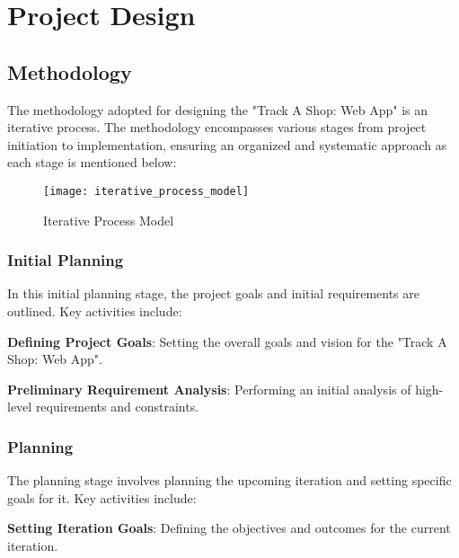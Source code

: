 
\chapter{Project Design} %

\label{Chapter3} %



\section{Methodology}
The methodology adopted for designing the "Track A Shop: Web App" is an iterative process. The methodology encompasses various stages from project initiation to implementation, ensuring an organized and systematic approach as each stage is mentioned below:

\begin{figure}[h]
	\centering
	\texttt{[image: iterative\_process\_model]}
	\caption{Iterative Process Model}
\end{figure}

\subsection{Initial Planning}

In this initial planning stage, the project goals and initial requirements are outlined. Key activities include:

\textbf{Defining Project Goals}: Setting the overall goals and vision for the "Track A Shop: Web App".

\textbf{Preliminary Requirement Analysis}:
Performing an initial analysis of high-level requirements and constraints.

\subsection{Planning}

The planning stage involves planning the upcoming iteration and setting specific goals for it. Key activities include:

\textbf{Setting Iteration Goals}:
Defining the objectives and outcomes for the current iteration.

